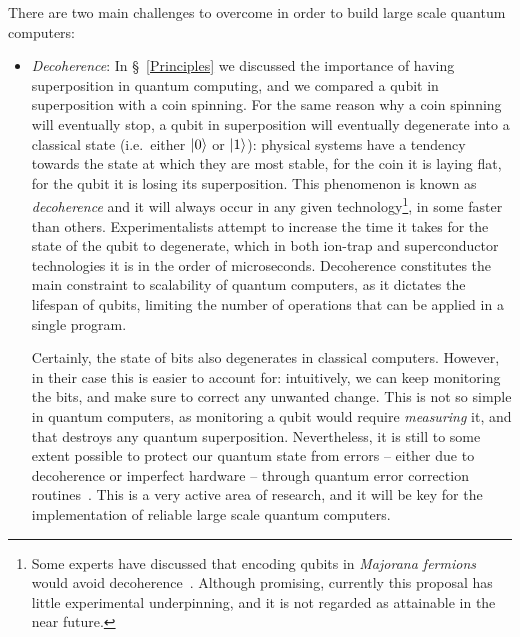 There are two main challenges to overcome in order to build large scale quantum computers:

\begin{itemize}

  \item \textit{Decoherence}: In \S~\ref{Principles} we discussed the importance of having superposition in quantum computing, and we compared a qubit in superposition with a coin spinning. For the same reason why a coin spinning will eventually stop, a qubit in superposition will eventually degenerate into a classical state (i.e.\ either \(\vert 0 \rangle\) or \(\vert 1 \rangle\)): physical systems have a tendency towards the state at which they are most stable, for the coin it is laying flat, for the qubit it is losing its superposition. This phenomenon is known as \textit{decoherence} and it will always occur in any given technology\footnote{Some experts have discussed that encoding qubits in \textit{Majorana fermions} would avoid decoherence~\citep{Majorana}. Although promising, currently this proposal has little experimental underpinning, and it is not regarded as attainable in the near future.}, in some faster than others. Experimentalists attempt to increase the time it takes for the state of the qubit to degenerate, which in both ion-trap and superconductor technologies it is in the order of microseconds. Decoherence constitutes the main constraint to scalability of quantum computers, as it dictates the lifespan of qubits, limiting the number of operations that can be applied in a single program. 

  Certainly, the state of bits also degenerates in classical computers. However, in their case this is easier to account for: intuitively, we can keep monitoring the bits, and make sure to correct any unwanted change. This is not so simple in quantum computers, as monitoring a qubit would require \textit{measuring} it, and that destroys any quantum superposition. Nevertheless, it is still to some extent possible to protect our quantum state from errors -- either due to decoherence or imperfect hardware -- through quantum error correction routines~\citep{QuantumErrorCorrection}. This is a very active area of research, and it will be key for the implementation of reliable large scale quantum computers.



\end{itemize}
